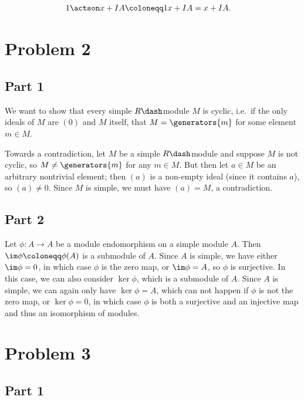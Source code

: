 \begin{align*}
1 \actson x + IA &\coloneqq 1x + IA = x + IA
.\end{align*}

\hypertarget{problem-2}{%
\section{Problem 2}\label{problem-2}}

\hypertarget{part-1-1}{%
\subsection{Part 1}\label{part-1-1}}

We want to show that every simple \(R\dash\)module \(M\) is cyclic,
i.e.~if the only ideals of \(M\) are \((0)\) and \(M\) itself, that
\(M = \generators{m}\) for some element \(m\in M\).

Towards a contradiction, let \(M\) be a simple \(R\dash\)module and
suppose \(M\) is not cyclic, so \(M\neq \generators{m}\) for any
\(m\in M\). But then let \(a\in M\) be an arbitrary nontrivial element;
then \((a)\) is a non-empty ideal (since it contains \(a\)), so
\((a) \neq 0\). Since \(M\) is simple, we must have \((a) = M\), a
contradiction.

\hypertarget{part-2-1}{%
\subsection{Part 2}\label{part-2-1}}

Let \(\phi: A \to A\) be a module endomorphism on a simple module \(A\).
Then \(\im \phi \coloneqq \phi(A)\) is a submodule of \(A\). Since \(A\)
is simple, we have either \(\im \phi = 0\), in which case \(\phi\) is
the zero map, or \(\im \phi = A\), so \(\phi\) is surjective. In this
case, we can also consider \(\ker \phi\), which is a submodule of \(A\).
Since \(A\) is simple, we can again only have \(\ker \phi = A\), which
can not happen if \(\phi\) is not the zero map, or \(\ker \phi = 0\), in
which case \(\phi\) is both a surjective and an injective map and thus
an isomorphism of modules.

\hypertarget{problem-3}{%
\section{Problem 3}\label{problem-3}}

\hypertarget{part-1-2}{%
\subsection{Part 1}\label{part-1-2}}

